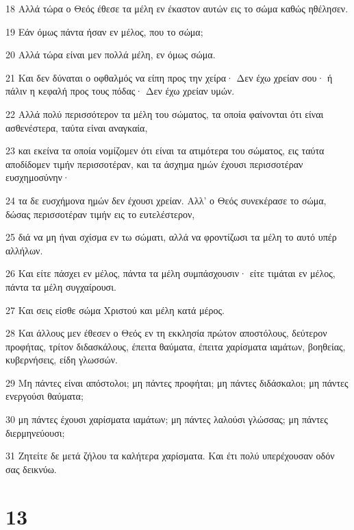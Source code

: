 \par 18 Αλλά τώρα ο Θεός έθεσε τα μέλη εν έκαστον αυτών εις το σώμα καθώς ηθέλησεν.
\par 19 Εάν όμως πάντα ήσαν εν μέλος, που το σώμα;
\par 20 Αλλά τώρα είναι μεν πολλά μέλη, εν όμως σώμα.
\par 21 Και δεν δύναται ο οφθαλμός να είπη προς την χείρα· Δεν έχω χρείαν σου· ή πάλιν η κεφαλή προς τους πόδας· Δεν έχω χρείαν υμών.
\par 22 Αλλά πολύ περισσότερον τα μέλη του σώματος, τα οποία φαίνονται ότι είναι ασθενέστερα, ταύτα είναι αναγκαία,
\par 23 και εκείνα τα οποία νομίζομεν ότι είναι τα ατιμότερα του σώματος, εις ταύτα αποδίδομεν τιμήν περισσοτέραν, και τα άσχημα ημών έχουσι περισσοτέραν ευσχημοσύνην·
\par 24 τα δε ευσχήμονα ημών δεν έχουσι χρείαν. Αλλ' ο Θεός συνεκέρασε το σώμα, δώσας περισσοτέραν τιμήν εις το ευτελέστερον,
\par 25 διά να μη ήναι σχίσμα εν τω σώματι, αλλά να φροντίζωσι τα μέλη το αυτό υπέρ αλλήλων.
\par 26 Και είτε πάσχει εν μέλος, πάντα τα μέλη συμπάσχουσιν· είτε τιμάται εν μέλος, πάντα τα μέλη συγχαίρουσι.
\par 27 Και σεις είσθε σώμα Χριστού και μέλη κατά μέρος.
\par 28 Και άλλους μεν έθεσεν ο Θεός εν τη εκκλησία πρώτον αποστόλους, δεύτερον προφήτας, τρίτον διδασκάλους, έπειτα θαύματα, έπειτα χαρίσματα ιαμάτων, βοηθείας, κυβερνήσεις, είδη γλωσσών.
\par 29 Μη πάντες είναι απόστολοι; μη πάντες προφήται; μη πάντες διδάσκαλοι; μη πάντες ενεργούσι θαύματα;
\par 30 μη πάντες έχουσι χαρίσματα ιαμάτων; μη πάντες λαλούσι γλώσσας; μη πάντες διερμηνεύουσι;
\par 31 Ζητείτε δε μετά ζήλου τα καλήτερα χαρίσματα. Και έτι πολύ υπερέχουσαν οδόν σας δεικνύω.

\chapter{13}

